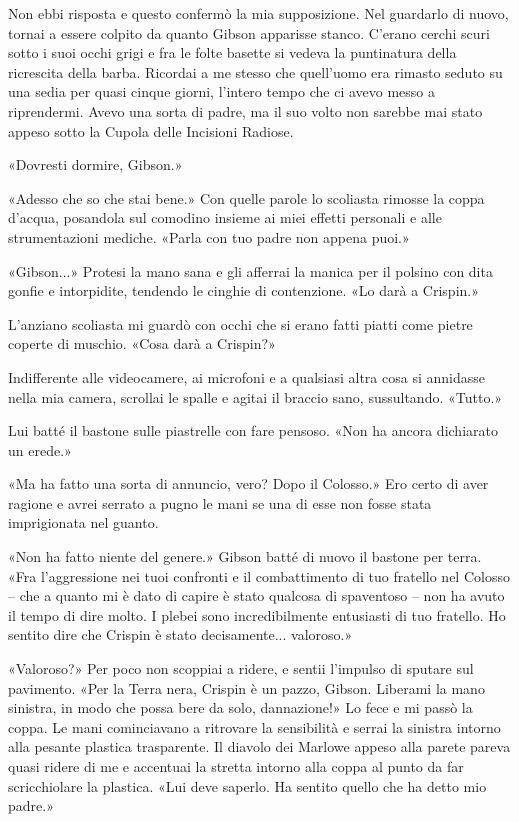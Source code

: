 Non ebbi risposta e questo confermò la mia supposizione. Nel guardarlo
di nuovo, tornai a essere colpito da quanto Gibson apparisse stanco.
C'erano cerchi scuri sotto i suoi occhi grigi e fra le folte basette si
vedeva la puntinatura della ricrescita della barba. Ricordai a me stesso
che quell'uomo era rimasto seduto su una sedia per quasi cinque giorni,
l'intero tempo che ci avevo messo a riprendermi. Avevo una sorta di
padre, ma il suo volto non sarebbe mai stato appeso sotto la Cupola
delle Incisioni Radiose.

«Dovresti dormire, Gibson.»

«Adesso che so che stai bene.» Con quelle parole lo scoliasta rimosse la
coppa d'acqua, posandola sul comodino insieme ai miei effetti personali
e alle strumentazioni mediche. «Parla con tuo padre non appena puoi.»

«Gibson...» Protesi la mano sana e gli afferrai la manica per il polsino
con dita gonfie e intorpidite, tendendo le cinghie di contenzione. «Lo
darà a Crispin.»

L'anziano scoliasta mi guardò con occhi che si erano fatti piatti come
pietre coperte di muschio. «Cosa darà a Crispin?»

Indifferente alle videocamere, ai microfoni e a qualsiasi altra cosa si
annidasse nella mia camera, scrollai le spalle e agitai il braccio sano,
sussultando. «Tutto.»

Lui batté il bastone sulle piastrelle con fare pensoso. «Non ha ancora
dichiarato un erede.»

«Ma ha fatto una sorta di annuncio, vero? Dopo il Colosso.» Ero certo di
aver ragione e avrei serrato a pugno le mani se una di esse non fosse
stata imprigionata nel guanto.

«Non ha fatto niente del genere.» Gibson batté di nuovo il bastone per
terra. «Fra l'aggressione nei tuoi confronti e il combattimento di tuo
fratello nel Colosso -- che a quanto mi è dato di capire è stato
qualcosa di spaventoso -- non ha avuto il tempo di dire molto. I plebei
sono incredibilmente entusiasti di tuo fratello. Ho sentito dire che
Crispin è stato decisamente... valoroso.»

«Valoroso?» Per poco non scoppiai a ridere, e sentii l'impulso di
sputare sul pavimento. «Per la Terra nera, Crispin è un pazzo, Gibson.
Liberami la mano sinistra, in modo che possa bere da solo, dannazione!»
Lo fece e mi passò la coppa. Le mani cominciavano a ritrovare la
sensibilità e serrai la sinistra intorno alla pesante plastica
trasparente. Il diavolo dei Marlowe appeso alla parete pareva quasi
ridere di me e accentuai la stretta intorno alla coppa al punto da far
scricchiolare la plastica. «Lui deve saperlo. Ha sentito quello che ha
detto mio padre.»


